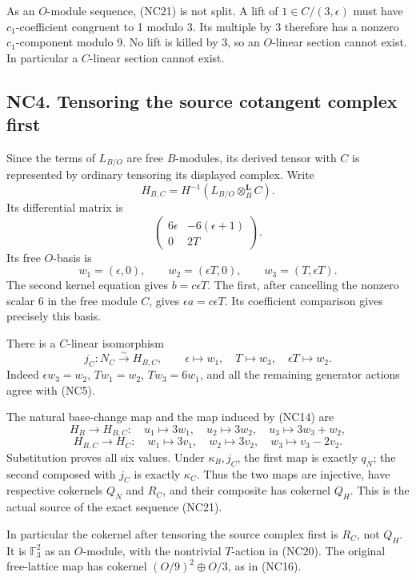 \documentclass[
]{article}
\begin{document}
As an \(O\)-module sequence, (NC21) is not split. A lift of
\(1\in C/(3,\epsilon)\) must have \(c_1\)-coefficient congruent to 1
modulo 3. Its multiple by 3 therefore has a nonzero \(c_1\)-component
modulo 9. No lift is killed by 3, so an \(O\)-linear section cannot
exist. In particular a \(C\)-linear section cannot exist.

\subsection{NC4. Tensoring the source cotangent complex
first}\label{nc4.-tensoring-the-source-cotangent-complex-first}

Since the terms of \(L_{B/O}\) are free \(B\)-modules, its derived
tensor with \(C\) is represented by ordinary tensoring its displayed
complex. Write \[
H_{B,C}=H^{-1}(L_{B/O}\otimes_B^{\mathbf L}C).
\] Its differential matrix is \[
\begin{pmatrix}6\epsilon&-6(\epsilon+1)\\0&2T\end{pmatrix}.
\] Its free \(O\)-basis is \[
w_1=(\epsilon,0),\qquad
w_2=(\epsilon T,0),\qquad
w_3=(T,\epsilon T).
\tag{NC23}
\] The second kernel equation gives \(b=c\epsilon T\). The first, after
cancelling the nonzero scalar 6 in the free module \(C\), gives
\(\epsilon a=c\epsilon T\). Its coefficient comparison gives precisely
this basis.

There is a \(C\)-linear isomorphism \[
j_C:N_C\xrightarrow{\sim}H_{B,C},\qquad
\epsilon\mapsto w_1,\quad T\mapsto w_3,\quad\epsilon T\mapsto w_2.
\tag{NC24}
\] Indeed \(\epsilon w_3=w_2\), \(Tw_1=w_2\), \(Tw_3=6w_1\), and all the
remaining generator actions agree with (NC5).

The natural base-change map and the map induced by (NC14) are \[
H_B\longrightarrow H_{B,C}:\quad
u_1\mapsto3w_1,\quad u_2\mapsto3w_2,\quad u_3\mapsto3w_3+w_2,
\] \[
H_{B,C}\longrightarrow H_C:\quad
w_1\mapsto3v_1,\quad w_2\mapsto3v_2,\quad w_3\mapsto v_3-2v_2.
\tag{NC25}
\] Substitution proves all six values. Under \(\kappa_B,j_C\), the first
map is exactly \(q_N\); the second composed with \(j_C\) is exactly
\(\kappa_C\). Thus the two maps are injective, have respective cokernels
\(Q_N\) and \(R_C\), and their composite has cokernel \(Q_H\). This is
the actual source of the exact sequence (NC21).

In particular the cokernel after tensoring the source complex first is
\(R_C\), not \(Q_H\). It is \(\mathbb F_3^2\) as an \(O\)-module, with
the nontrivial \(T\)-action in (NC20). The original free-lattice map has
cokernel \((O/9)^2\oplus O/3\), as in (NC16).
\end{document}
